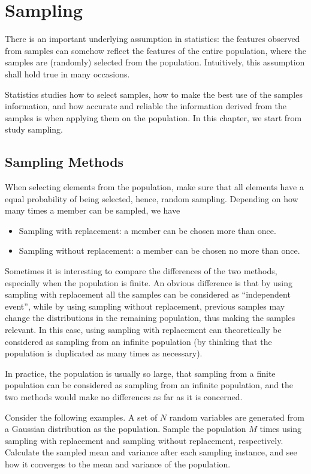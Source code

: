 \chapter{Sampling} \label{ch:sampling}

There is an important underlying assumption in statistics: the features observed from samples can somehow reflect the features of the entire population, where the samples are (randomly) selected from the population. Intuitively, this assumption shall hold true in many occasions.

Statistics studies how to select samples, how to make the best use of the samples information, and how accurate and reliable the information derived from the samples is when applying them on the population. In this chapter, we start from study sampling.

\section{Sampling Methods}

When selecting elements from the population, make sure that all elements have a equal probability of being selected, hence, random sampling. Depending on how many times a member can be sampled, we have
\begin{itemize}
  \item Sampling with replacement: a member can be chosen more than once.
  \item Sampling without replacement: a member can be chosen no more than once.
\end{itemize}

Sometimes it is interesting to compare the differences of the two methods, especially when the population is finite. An obvious difference is that by using sampling with replacement all the samples can be considered as ``independent event'', while by using sampling without replacement, previous samples may change the distributions in the remaining population, thus making the samples relevant. In this case, using sampling with replacement can theoretically be considered as sampling from an infinite population (by thinking that the population is duplicated as many times as necessary).

In practice, the population is usually so large, that sampling from a finite population can be considered as sampling from an infinite population, and the two methods would make no differences as far as it is concerned.

Consider the following examples. A set of $N$ random variables are generated from a Gaussian distribution as the population. Sample the population $M$ times using sampling with replacement and sampling without replacement, respectively. Calculate the sampled mean and variance after each sampling instance, and see how it converges to the mean and variance of the population.

